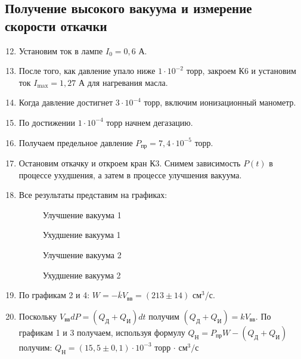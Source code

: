 \documentclass[12pt,a4paper]{article}
\begin{document}
\subsection*{Получение высокого вакуума и измерение скорости откачки}
\begin{enumerate}
        \setcounter{enumi}{11}
        \item Установим ток в лампе $I_0 = 0{,}6$ А.
        \item После того, как давление упало ниже $1\cdot 10^{-2}$ торр, 
        закроем К6 и установим ток $I_{\text{max}} = 1{,}27$ А для нагревания
        масла. 
        \item Когда давление достигнет $3\cdot10^{-4}$ торр, включим ионизационный
        манометр.
        \item По достижении $1\cdot 10^{-4}$ торр начнем дегазацию.
        \item Получаем предельное давление $P_{\text{пр}} = 7{,}4\cdot 10^{-5}$
        торр.
        \item Остановим откачку и откроем кран К3. Снимем зависимость $P(t)$
        в процессе ухудшения, а затем в процессе улучшения вакуума.
        \item Все результаты представим на графиках:
        \begin{figure}[H]
            \centering
            
            \caption{Улучшение вакуума 1}
            \label{graph1}
        \end{figure}
        \begin{figure}[H]
            \centering
            
            \caption{Ухудшение вакуума 1}
            \label{graph2}
        \end{figure}
        \begin{figure}[H]
            \centering
            
            \caption{Улучшение вакуума 2}
            \label{graph3}
        \end{figure}
        \begin{figure}[H]
            \centering
            
            \caption{Ухудшение вакуума 2}
            \label{graph4}
        \end{figure}
        \item По графикам 2 и 4:
        $W = -\overline{k}V_{\text{вв}} = (213\pm 14)$ см$^3$/с.
        \item Поскольку $V_\text{вв}dP = (Q_\text{Д} + Q_\text{И}) dt$ получим $(Q_\text{Д} + Q_\text{И}) = kV_\text{вв}$. По графикам 1 и 3 получаем, используя формулу $Q_\text{Н} = P_\text{пр}W - (Q_\text{Д} + Q_\text{И})$ получим: $Q_\text{Н}=(15,5\pm0,1)\cdot 10^{-3}$ торр $\cdot$ $с\text{м}^3/\text{с}$

\end{enumerate}
\end{document}
